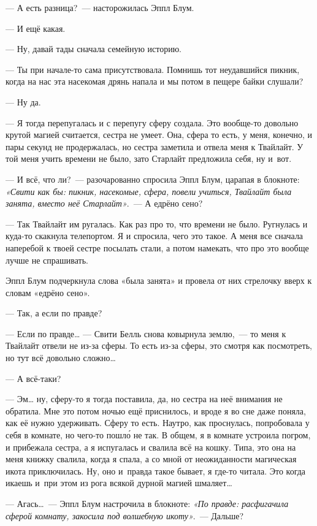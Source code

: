 \documentclass[fontsize=11pt,a5paper,titlepage=firstcover]{scrbook}
\begin{document}
--- А есть разница?~--- насторожилась Эппл Блум.

--- И ещё какая.

--- Ну, давай тады сначала семейную историю.

--- Ты при начале-то сама присутствовала. Помнишь тот неудавшийся пикник, когда на нас эта насекомая дрянь напала и мы потом в пещере байки слушали?

--- Ну да.

--- Я тогда перепугалась и с перепугу сферу создала. Это вообще-то довольно крутой магией считается, сестра не умеет. Она, сфера то есть, у меня, конечно, и пары секунд не продержалась, но сестра заметила и отвела меня к Твайлайт. У той меня учить времени не было, зато Старлайт предложила себя, ну и~вот.

--- И всё, что ли?~--- разочарованно спросила Эппл Блум, царапая в блокноте: \emph{«Свити как бы: пикник, насекомые, сфера, повели учиться, Твайлайт была занята, вместо неё Старлайт»}.~--- А едрёно сено?

--- Так Твайлайт им ругалась. Как раз про то, что времени не было. Ругнулась и куда-то скакнула телепортом. Я и спросила, чего это такое. А меня все сначала наперебой к твоей сестре посылать стали, а потом намекать, что про это вообще лучше не спрашивать.

Эппл Блум подчеркнула слова «была занята» и провела от них стрелочку вверх к словам «едрёно сено».

--- Так, а если по правде?

--- Если по правде{\ldots} --- Свити Белль снова ковырнула землю,~--- то меня к Твайлайт отвели не из-за сферы. То есть из-за сферы, это смотря как посмотреть, но тут всё довольно сложно{\ldots}

--- А всё-таки?

--- Эм{\ldots} ну, сферу-то я тогда поставила, да, но сестра на неё внимания не обратила. Мне это потом ночью ещё приснилось, и вроде я во сне даже поняла, как её нужно удерживать. Сферу то есть. Наутро, как проснулась, попробовала у себя в комнате, но чего-то пошло́ не так. В общем, я в комнате устроила погром, и прибежала сестра, а я испугалась и свалила всё на кошку. Типа, это она на меня книжку свалила, когда я спала, а со мной от неожиданности магическая икота приключилась. Ну, оно и~правда такое бывает, я где-то читала. Это когда икаешь и~при этом из рога всякой дурной магией шмаляет{\ldots}

--- Агась{\ldots}~--- Эппл Блум настрочила в блокноте: \emph{«По правде: расфигачила сферой комнату, закосила под волшебную икоту»}.~--- Дальше?
\end{document}
